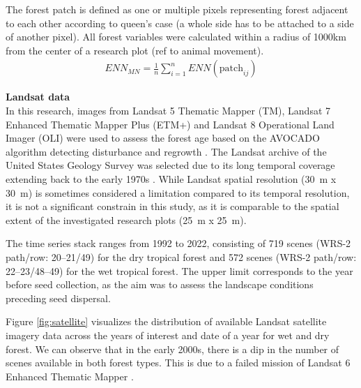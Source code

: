 The forest patch is defined as one or multiple pixels representing forest adjacent to each other according to queen's case (a whole side has to be attached to a side of another pixel). All forest variables were calculated within a radius of 1000km from the center of a research plot \citep{hesselbarthLandscapemetricsOpensourceTool2019} (ref to animal movement).  \\

\begin{align}
\label{eq:eucledean}
ENN_{MN} = \frac{1}{n} \sum_{i=1}^{n} ENN(\text{patch}_{ij})
\end{align}

\textbf{Landsat data}\\

In this research, images from Landsat 5 Thematic Mapper (TM), Landsat 7 Enhanced Thematic Mapper Plus (ETM+) and Landsat 8 Operational Land Imager (OLI) were used to assess the forest age based on the AVOCADO algorithm detecting disturbance and regrowth \citep{decuyperContinuousMonitoringForest2022}. The Landsat archive of the United States Geology Survey was selected due to its long temporal coverage extending back to the early 1970s \citep{kennedyBringingEcologicalView2014, finerCombatingDeforestationSatellite2018}. While Landsat spatial resolution (30~m x 30~m) is sometimes considered a limitation compared to its temporal resolution, it is not a significant constrain in this study, as it is comparable to the spatial extent of the investigated research plots (25~m x 25~m). 

The time series stack ranges from 1992 to 2022, consisting of 719 scenes (WRS-2 path/row: 20–21/49) for the dry tropical forest and 572 scenes (WRS-2 path/row: 22–23/48–49) for the wet tropical forest. The upper limit corresponds to the year before seed collection, as the aim was to assess the landscape conditions preceding seed dispersal.

Figure \ref{fig:satellite} visualizes the distribution of available Landsat satellite imagery data across the years of interest and date of a year for wet and dry forest. We can observe that in the early 2000s, there is a dip in the number of scenes available in both forest types. This is due to a failed mission of Landsat 6 Enhanced Thematic Mapper \citep{gowardHistoricalRecordLandsat2006}.


